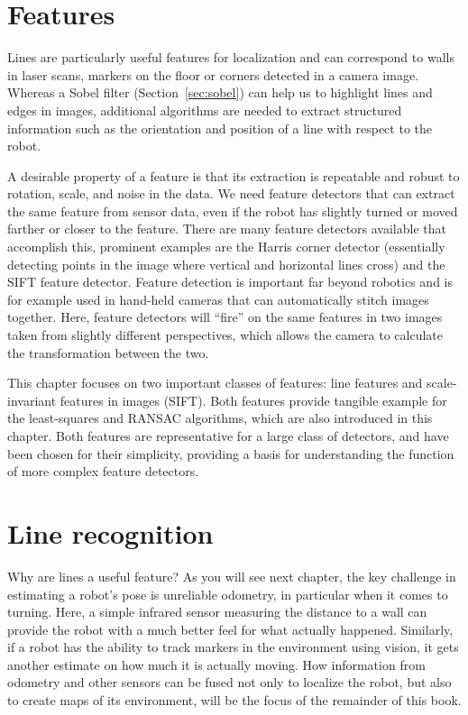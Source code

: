 \section{Features}
Lines are particularly useful features for localization and can correspond to walls in laser scans, markers on the floor or corners detected in a camera image. Whereas a Sobel filter (Section~\ref{sec:sobel}) can help us to highlight lines and edges in images, additional algorithms are needed to extract structured information such as the orientation and position of a line with respect to the robot.

A desirable property of a feature is that its extraction is repeatable and robust to rotation, scale, and noise in the data. We need feature detectors that can extract the same feature from sensor data, even if the robot has slightly turned or moved farther or closer to the feature. There are many feature detectors available that accomplish this, prominent examples are the Harris corner detector (essentially detecting points in the image where vertical and horizontal lines cross) and the SIFT feature detector. Feature detection is important far beyond robotics and is for example used in hand-held cameras that can automatically stitch images together. Here, feature detectors will ``fire'' on the same features in two images taken from slightly different perspectives, which allows the camera to calculate the transformation between the two.

This chapter focuses on two important classes of features: line features and scale-invariant features in images (SIFT). Both features provide tangible example for the least-squares and RANSAC algorithms, which are also introduced in this chapter. Both features are representative for a large class of detectors, and have been chosen for their simplicity, providing a basis for understanding the function of more complex feature detectors.

\section{Line recognition}
Why are lines a useful feature? As you will see next chapter, the key challenge in estimating a robot's pose is unreliable odometry, in particular when it comes to turning. Here, a simple infrared sensor measuring the distance to a wall can provide the robot with a much better feel for what actually happened. Similarly, if a robot has the ability to track markers in the environment using vision, it gets another estimate on how much it is actually moving. How information from odometry and other sensors can be fused not only to localize the robot, but also to create maps of its environment, will be the focus of the remainder of this book.

